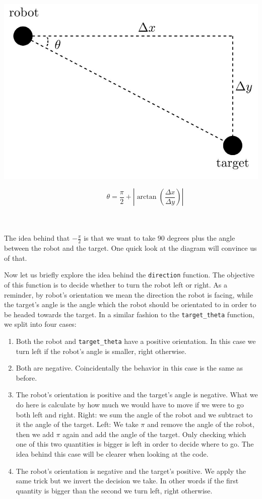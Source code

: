\begin{minipage}{0.4\textwidth}
\includegraphics[width=\linewidth]{images/theta4.jpg}
\end{minipage}
\begin{minipage}{0.5\textwidth}\raggedleft
$$\quad \quad \quad \quad \theta = \frac{\pi}{2} + \left| \arctan\left(\frac{\Delta x}{\Delta y}\right) \right|$$ \\
\end{minipage}
\noindent
\\
The idea behind that $- \frac{\pi}{2}$ is that we want to take $90$ degrees plus the angle between the robot and the target. One quick look at the diagram will convince us of that. 
\par 
Now let us briefly explore the idea behind the \texttt{direction} function. The objective of this function is to decide whether to turn the robot left or right. As a reminder, by robot's orientation we mean the direction the robot is facing, while the target's angle is the angle which the robot should be orientated to in order to be headed towards the target. In a similar fashion to the \texttt{target\_theta} function, we split into four cases:
\begin{enumerate}
    \item Both the robot and \texttt{target\_theta} have a positive orientation. In this case we turn left if the robot's angle is smaller, right otherwise.
    \item Both are negative. Coincidentally the behavior in this case is the same as before.
    \item The robot's orientation is positive and the target's angle is negative. What we do here is calculate by how much we would have to move if we were to go both left and right. Right: we sum the angle of the robot and we subtract to it the angle of the target. Left: We take $\pi$ and remove the angle of the robot, then we add $\pi$ again and add the angle of the target. Only checking which one of this two quantities is bigger is left in order to decide where to go. The idea behind this case will be clearer when looking at the code.
    \item The robot's orientation is negative and the target's positive. We apply the same trick but we invert the decision we take. In other words if the first quantity is bigger than the second we turn left, right otherwise.
\end{enumerate}
